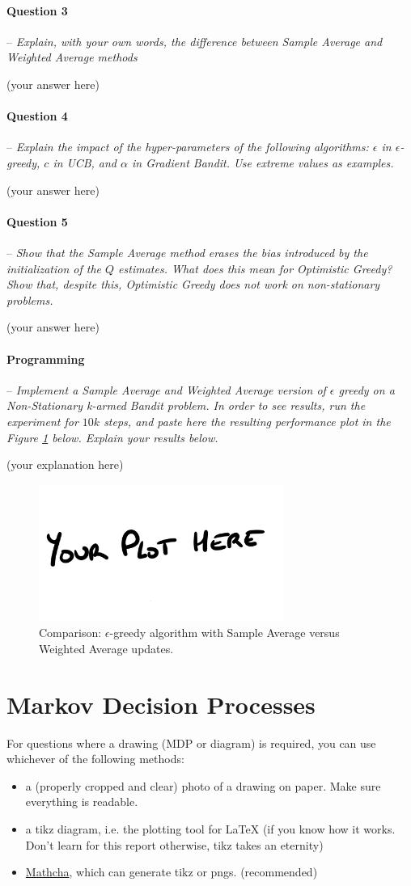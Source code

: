 \documentclass[a4paper]{article}
\newcommand{\question}[2]{
\paragraph{Question #1} -- \textit{#2}

}
\newcommand{\programming}[1]{
\paragraph{Programming} -- \textit{#1}

}
\begin{document}
\question{3}{Explain, with your own words, the difference between Sample Average and Weighted Average methods}
(your answer here)

\question{4}{Explain the impact of the hyper-parameters of the following algorithms: $\epsilon$ in $\epsilon$-greedy, $c$ in UCB, and $\alpha$ in Gradient Bandit. Use extreme values as examples.}
(your answer here)

\question{5}{Show that the Sample Average method erases the bias introduced by the initialization of the $Q$ estimates. What does this mean for Optimistic Greedy? Show that, despite this, Optimistic Greedy does not work on non-stationary problems.}
(your answer here)

\programming{Implement a Sample Average and Weighted Average version of $\epsilon$ greedy on a Non-Stationary k-armed Bandit problem. In order to see results, run the experiment for $10k$ steps, and paste here the resulting performance plot in the Figure \ref{fig:sa_vs_wa} below. Explain your results below.}
(your explanation here)
\begin{figure}[H]
    \centering
    \includegraphics[width=8cm]{plots/your_plot_here.png}
    \caption{Comparison: $\epsilon$-greedy algorithm with Sample Average versus Weighted Average updates.}
    \label{fig:sa_vs_wa}
\end{figure}{}


\section{Markov Decision Processes}
For questions where a drawing (MDP or diagram) is required, you can use whichever of the following methods:
\begin{itemize}
    \item a (properly cropped and clear) photo of a drawing on paper. Make sure everything is readable.
    \item a tikz diagram, i.e. the plotting tool for LaTeX (if you know how it works. Don't learn for this report otherwise, tikz takes an eternity)
    \item \href{www.mathcha.io}{Mathcha}, which can generate tikz or pngs. (recommended)
\end{itemize}{}
\end{document}
